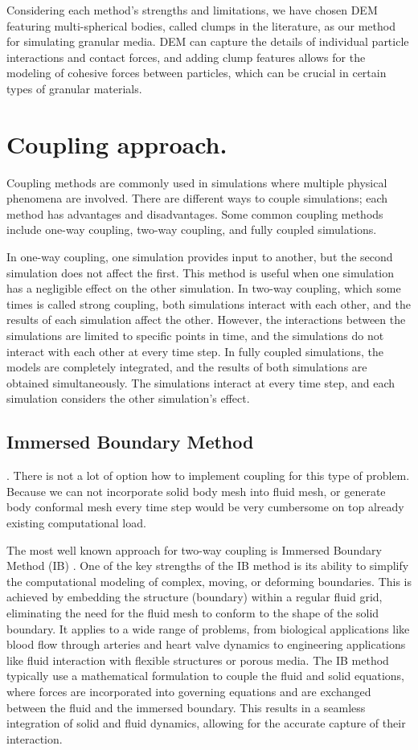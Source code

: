 Considering each method's strengths and limitations, we have chosen DEM featuring multi-spherical bodies, called clumps in the literature, as our method for simulating granular media. DEM can capture the details of individual particle interactions and contact forces, and adding clump features allows for the modeling of cohesive forces between particles, which can be crucial in certain types of granular materials. 

\section{Coupling approach.}

Coupling methods are commonly used in simulations where multiple physical phenomena are involved. There are different ways to couple simulations; each method has advantages and disadvantages. Some common coupling methods include one-way coupling, two-way coupling, and fully coupled simulations.

In one-way coupling, one simulation provides input to another, but the second simulation does not affect the first. This method is useful when one simulation has a negligible effect on the other simulation. In two-way coupling, which some times is called strong coupling, both simulations interact with each other, and the results of each simulation affect the other. However, the interactions between the simulations are limited to specific points in time, and the simulations do not interact with each other at every time step. In fully coupled simulations, the models are completely integrated, and the results of both simulations are obtained simultaneously. The simulations interact at every time step, and each simulation considers the other simulation's effect.

\subsection{Immersed Boundary Method}.
There is not a lot of option how to implement coupling for this type of problem. Because we can not incorporate solid body mesh into fluid mesh, or generate body conformal mesh every time step would be very cumbersome on top already existing computational load. 

The most well known approach for two-way coupling is Immersed Boundary Method (IB) \cite{mittal2005immersed}. One of the key strengths of the IB method is its ability to simplify the computational modeling of complex, moving, or deforming boundaries. This is achieved by embedding the structure (boundary) within a regular fluid grid, eliminating the need for the fluid mesh to conform to the shape of the solid boundary. It applies to a wide range of problems, from biological applications like blood flow through arteries and heart valve dynamics to engineering applications like fluid interaction with flexible structures or porous media. The IB method typically use a mathematical formulation to couple the fluid and solid equations, where forces are incorporated into governing equations and are exchanged between the fluid and the immersed boundary. This results in a seamless integration of solid and fluid dynamics, allowing for the accurate capture of their interaction. 

